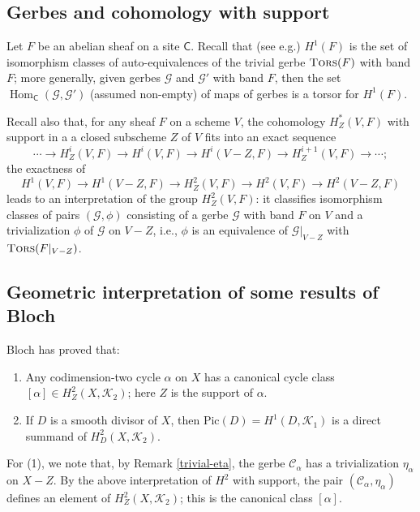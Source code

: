 \documentclass{amsart}
\numberwithin{equation}{subsection}
\theoremstyle{remark}
\theoremstyle{remark}
\newcommand{\eg}{e.g.\xspace}
\newcommand{\too}{\longrightarrow}%
\newcommand{\cC}{\mathcal{C}}
\newcommand{\cG}{\mathcal{G}}
\newcommand{\cK}{\mathcal{K}}
\newcommand{\C}{\mathsf{C}} %
\DeclareMathOperator{\Hom}{Hom}
\DeclareMathOperator{\tors}{\textsc{Tors}} %
\begin{document}
\subsection{Gerbes and cohomology with support}\label{support}

Let $F$ be an abelian sheaf on a site $\C$. Recall that (see \eg \cite[\S5.1]{Milne})
$H^1(F)$ is the set of isomorphism classes of auto-equivalences of the trivial gerbe $\tors(F)$ with band $F$; more generally, given gerbes $\cG$ and $\cG'$ with band $F$, then the set $\Hom_\C(\cG, \cG')$ (assumed non-empty) of maps of gerbes is a torsor for $H^1(F)$.

Recall also that, for any sheaf $F$ on a scheme $V$, the cohomology $H^*_Z(V, F)$ with support in a  a closed subscheme $Z$ of $V$ fits into an exact sequence \cite[\S 5]{Bloch}
\begin{equation}
\cdots \too H^i_Z(V,F) \too H^i(V,F) \too H^i(V - Z,F) \too H^{i+1}_Z(V, F) \too \cdots ;
\end{equation} 
the exactness of
\begin{equation*}
   H^1(V, F) \too H^1(V- Z, F) \too H^2_Z(V,F) \too H^2(V, F) \too H^2(V -Z, F)
\end{equation*}
leads to an interpretation of the group $H^2_Z(V, F)$: it classifies isomorphism classes of pairs $(\cG, \phi)$ consisting of a gerbe $\cG$ with band $F$ on $V$ and a trivialization $\phi$ of $\cG$ on $V-Z$, i.e., $\phi$ is an equivalence of $\cG|_{V-Z}$ with $\tors(F|_{V-Z})$. 
 
 \subsection{Geometric interpretation of some results of Bloch}  Bloch \cite{Bloch} has proved that: 
\begin{enumerate}
\item \cite[Proposition 5.3]{Bloch} Any codimension-two cycle $\alpha$ on $X$ has a canonical cycle class  $[\alpha] \in H^2_Z(X, \cK_2)$; here $Z$ is the support of $\alpha$. 
\item \cite[Theorem 5.11]{Bloch} If $D$ is a smooth divisor of $X$, then $\mathrm{Pic}(D) = H^1(D, \cK_1)$ is a 
direct summand of $H^2_D(X, \cK_2)$. 
\end{enumerate}

For (1), we note that, by Remark \ref{trivial-eta}, the gerbe $\cC_{\alpha}$ has a trivialization $\eta_{\alpha}$ on $X - Z$.  By the above interpretation of $H^2$ with support, the pair $(\cC_{\alpha}, \eta_{\alpha})$  defines an element of $H^2_Z(X, \cK_2)$; this is the canonical class $[\alpha]$.
\end{document}
